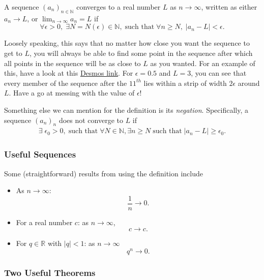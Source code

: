 \documentclass[
  10pt,
  a4paper]{article}
\providecommand{\tightlist}{%
  \setlength{\itemsep}{0pt}\setlength{\parskip}{0pt}}
\theoremstyle{plain}
\theoremstyle{definition}
\theoremstyle{plain}
\theoremstyle{plain}
\theoremstyle{plain}
\theoremstyle{plain}
\theoremstyle{definition}
\theoremstyle{definition}
\theoremstyle{remark}
\theoremstyle{remark}
\let\BeginKnitrBlock\begin \let\EndKnitrBlock\end
\begin{document}
\BeginKnitrBlock{definition}[Sequence Convergence]
{\label{def:def2} }A sequence \((a_n)_{n\in\mathbb{N}}\) converges to a real number \(L\) as \(n \longrightarrow \infty\), written as either \(a_n \longrightarrow L\), or \(\lim_{n \to \infty}a_n = L\) if \[\forall \epsilon > 0, \; \exists N = N(\epsilon) \in \mathbb{N}, \; \text{such that} \; \forall n \geq N, \; \lvert a_n - L \rvert < \epsilon.\]
\EndKnitrBlock{definition}
Loosely speaking, this says that no matter how close you want the sequence to get to \(L\), you will always be able to find some point in the sequence after which all points in the sequence will be as close to \(L\) as you wanted. For an example of this, have a look at this \href{https://www.desmos.com/calculator/dfkjgg0wzj}{Desmos link}. For \(\epsilon = 0.5\) and \(L = 3\), you can see that every member of the sequence after the \(11^{th}\) lies within a strip of width \(2\epsilon\) around \(L\). Have a go at messing with the value of \(\epsilon\)!

Something else we can mention for the definition is its \emph{negation}. Specifically, a sequence \((a_n)_n\) does not converge to \(L\) if
\begin{align*}
    \exists\; \epsilon_0 > 0, \; \text{such that} \; \forall N \in \mathbb{N}, \exists n \geq N \; \text{such that} \; \lvert a_n - L \rvert \geq \epsilon_0.
\end{align*}

\hypertarget{useful-sequences}{%
\subsubsection{Useful Sequences}\label{useful-sequences}}

Some (straightforward) results from using the definition include

\begin{itemize}
\tightlist
\item
  As \(n \longrightarrow \infty\): \[\frac{1}{n} \longrightarrow 0.\]
\item
  For a real number \(c\): as \(n \longrightarrow \infty\), \[c \longrightarrow c.\]
\item
  For \(q \in \mathbb{R}\) with \(\lvert q \rvert < 1\): as \(n \longrightarrow \infty\) \[q^n \longrightarrow 0.\]
\end{itemize}

\hypertarget{two-useful-theorems}{%
\subsubsection{Two Useful Theorems}\label{two-useful-theorems}}
\end{document}
